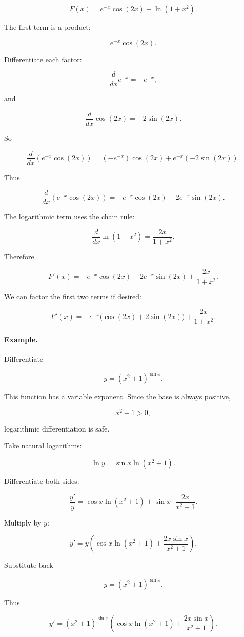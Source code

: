 \[
F(x)=e^{-x}\cos(2x)+\ln(1+x^2).
\]

The first term is a product:

\[
e^{-x}\cos(2x).
\]

Differentiate each factor:

\[
\frac{d}{dx}e^{-x}=-e^{-x},
\]

and

\[
\frac{d}{dx}\cos(2x)=-2\sin(2x).
\]

So

\[
\frac{d}{dx}\left(e^{-x}\cos(2x)\right)
=
(-e^{-x})\cos(2x)+e^{-x}(-2\sin(2x)).
\]

Thus

\[
\frac{d}{dx}\left(e^{-x}\cos(2x)\right)
=
-e^{-x}\cos(2x)-2e^{-x}\sin(2x).
\]

The logarithmic term uses the chain rule:

\[
\frac{d}{dx}\ln(1+x^2)=\frac{2x}{1+x^2}.
\]

Therefore

\[
\boxed{
F'(x)
=
-e^{-x}\cos(2x)-2e^{-x}\sin(2x)
+
\frac{2x}{1+x^2}.
}
\]

We can factor the first two terms if desired:

\[
F'(x)
=
-e^{-x}\bigl(\cos(2x)+2\sin(2x)\bigr)
+
\frac{2x}{1+x^2}.
\]

\paragraph{Example.}
Differentiate

\[
y=(x^2+1)^{\sin x}.
\]

This function has a variable exponent.  Since the base is always positive,

\[
x^2+1>0,
\]

logarithmic differentiation is safe.

Take natural logarithms:

\[
\ln y=\sin x\ln(x^2+1).
\]

Differentiate both sides:

\[
\frac{y'}{y}
=
\cos x\ln(x^2+1)
+
\sin x\cdot\frac{2x}{x^2+1}.
\]

Multiply by \(y\):

\[
y'
=
y\left(
\cos x\ln(x^2+1)
+
\frac{2x\sin x}{x^2+1}
\right).
\]

Substitute back

\[
y=(x^2+1)^{\sin x}.
\]

Thus

\[
\boxed{
y'
=
(x^2+1)^{\sin x}
\left(
\cos x\ln(x^2+1)
+
\frac{2x\sin x}{x^2+1}
\right).
}
\]

